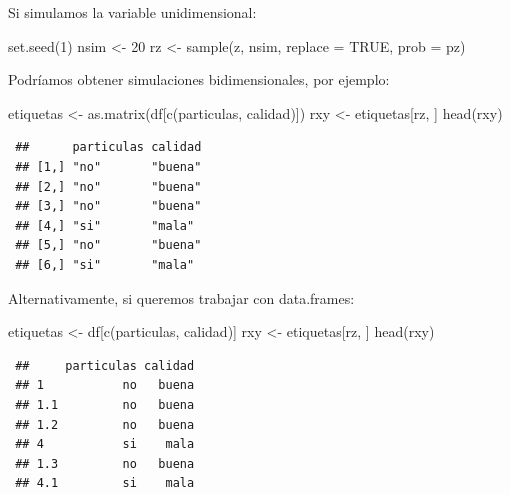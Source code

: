 \documentclass[
  10pt,
]{book}
\newenvironment{Shaded}{\begin{snugshade}}{\end{snugshade}}
\newcommand{\AttributeTok}[1]{\textcolor[rgb]{0.77,0.63,0.00}{#1}}
\newcommand{\ConstantTok}[1]{\textcolor[rgb]{0.00,0.00,0.00}{#1}}
\newcommand{\DecValTok}[1]{\textcolor[rgb]{0.00,0.00,0.81}{#1}}
\newcommand{\FunctionTok}[1]{\textcolor[rgb]{0.00,0.00,0.00}{#1}}
\newcommand{\NormalTok}[1]{#1}
\newcommand{\OtherTok}[1]{\textcolor[rgb]{0.56,0.35,0.01}{#1}}
\newcommand{\StringTok}[1]{\textcolor[rgb]{0.31,0.60,0.02}{#1}}
\theoremstyle{break}
\theoremstyle{nonumberplain}
\begin{document}
Si simulamos la variable unidimensional:

\begin{Shaded}
\begin{Highlighting}[]
\FunctionTok{set.seed}\NormalTok{(}\DecValTok{1}\NormalTok{)}
\NormalTok{nsim }\OtherTok{\textless{}{-}} \DecValTok{20}
\NormalTok{rz }\OtherTok{\textless{}{-}} \FunctionTok{sample}\NormalTok{(z, nsim, }\AttributeTok{replace =} \ConstantTok{TRUE}\NormalTok{, }\AttributeTok{prob =}\NormalTok{ pz)}
\end{Highlighting}
\end{Shaded}

Podríamos obtener simulaciones bidimensionales, por ejemplo:

\begin{Shaded}
\begin{Highlighting}[]
\NormalTok{etiquetas }\OtherTok{\textless{}{-}} \FunctionTok{as.matrix}\NormalTok{(df[}\FunctionTok{c}\NormalTok{(}\StringTok{\textquotesingle{}particulas\textquotesingle{}}\NormalTok{, }\StringTok{\textquotesingle{}calidad\textquotesingle{}}\NormalTok{)])}
\NormalTok{rxy }\OtherTok{\textless{}{-}}\NormalTok{ etiquetas[rz, ]}
\FunctionTok{head}\NormalTok{(rxy)}
\end{Highlighting}
\end{Shaded}

\begin{verbatim}
 ##      particulas calidad
 ## [1,] "no"       "buena"
 ## [2,] "no"       "buena"
 ## [3,] "no"       "buena"
 ## [4,] "si"       "mala" 
 ## [5,] "no"       "buena"
 ## [6,] "si"       "mala"
\end{verbatim}

Alternativamente, si queremos trabajar con data.frames:

\begin{Shaded}
\begin{Highlighting}[]
\NormalTok{etiquetas }\OtherTok{\textless{}{-}}\NormalTok{ df[}\FunctionTok{c}\NormalTok{(}\StringTok{\textquotesingle{}particulas\textquotesingle{}}\NormalTok{, }\StringTok{\textquotesingle{}calidad\textquotesingle{}}\NormalTok{)]}
\NormalTok{rxy }\OtherTok{\textless{}{-}}\NormalTok{ etiquetas[rz, ]}
\FunctionTok{head}\NormalTok{(rxy)}
\end{Highlighting}
\end{Shaded}

\begin{verbatim}
 ##     particulas calidad
 ## 1           no   buena
 ## 1.1         no   buena
 ## 1.2         no   buena
 ## 4           si    mala
 ## 1.3         no   buena
 ## 4.1         si    mala
\end{verbatim}
\end{document}
